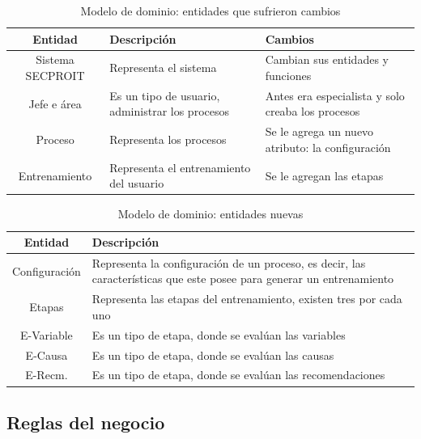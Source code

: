 \begin{table}[H]
\begin{center}
\begin{tabular}{ | c | p{5cm} |  p{5cm} | }
\hline
\textbf{Entidad} & \textbf{Descripción} & \textbf{Cambios}\\
\hline
Sistema SECPROIT & Representa el sistema & Cambian sus entidades y funciones \\
\hline
Jefe e área & Es un tipo de usuario, administrar los procesos & Antes era especialista y solo creaba los procesos \\
\hline
Proceso & Representa los procesos & Se le agrega un nuevo atributo: la configuración \\
\hline
Entrenamiento & Representa el entrenamiento del usuario & Se le agregan las etapas \\
\hline
\end{tabular}
\caption{Modelo de dominio: entidades que sufrieron cambios}
\label{tab:ent-amarilla}
\end{center}
\end{table}

\begin{table}[t]
\begin{center}
\begin{tabular}{ | c | p{10cm} | }
\hline
\textbf{Entidad} & \textbf{Descripción} \\
\hline
Configuración & Representa la configuración de un proceso, es decir, las características que este posee para generar un entrenamiento \\
\hline
Etapas & Representa las etapas del entrenamiento, existen tres por cada uno \\
\hline
E-Variable & Es un tipo de etapa, donde se evalúan las variables \\
\hline
E-Causa & Es un tipo de etapa, donde se evalúan las causas \\
\hline
E-Recm. & Es un tipo de etapa, donde se evalúan las recomendaciones \\
\hline
\end{tabular}
\caption{Modelo de dominio: entidades nuevas}
\label{tab:ent-verde}
\end{center}
\end{table}

\subsection{Reglas del negocio}

